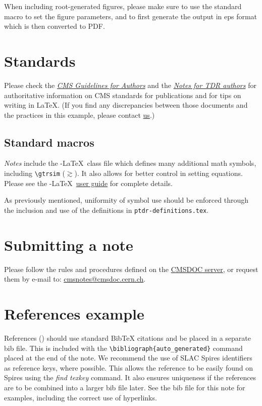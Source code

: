 When including root-generated figures, please make sure to use the standard macro to set the figure parameters,
and to first generate the output in eps format which is then converted to PDF.

\section{Standards}
Please check the
\textit{\href{http://cms.cern.ch/cmspb/mainColumnParagraphs/00/document/CMSGuidelines.pdf}{CMS
Guidelines for Authors}} and the
\textit{\href{http://cmsdoc.cern.ch/cms/cpt/tdr/notes_for_authors_temp.pdf}{Notes
for TDR authors}} for authoritative information on CMS standards
for publications and for tips on writing in \LaTeX. (If you find any discrepancies between those
documents and the practices in this example, please contact
\href{mailto:George.Alverson@cern.ch}{us}.)

\subsection{Standard macros}
\textit{Notes} include the \AmS-\LaTeX\ class file which defines
many additional math symbols, including \verb|\gtrsim|
($\gtrsim$). It also allows for better control in setting
equations. Please see the \AmS-\LaTeX\
\href{ftp://ftp.ams.org/pub/tex/doc/amsmath/amsldoc.pdf}{user
guide} for complete details.

As previously mentioned, uniformity of symbol use should be enforced through the inclusion and use of the definitions  in \texttt{ptdr-definitions.tex}.


\section{Submitting a note}

Please follow the rules and procedures defined on the
\href{http://cms.cern.ch/iCMS/jsp/iCMS.jsp?mode=single&part=publications}{CMSDOC
server}, or request them by e-mail to:
\href{mailto:cmsnotes@cmsdoc.cern.ch}{cmsnotes@cmsdoc.cern.ch}.

\section{References example}

References (\cite{CMS_AN_2006-027,CMS_NOTE_2006-106,Brandt:1997gi}) should use standard
BibTeX citations and be placed in a separate bib file. This is included with the \verb+\bibliograph{auto_generated}+ command placed at the end of the note.
We recommend the use of SLAC Spires
identifiers as reference keys, where possible. This allows the reference to be easily found on Spires using the \textit{find texkey}
command. It also ensures uniqueness if the references are to be combined into a larger bib file later. See the bib file for this note for examples, including the correct use of hyperlinks.


